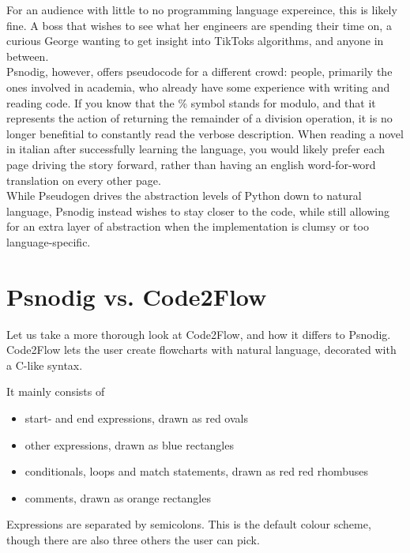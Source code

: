 For an audience with little to no programming language expereince, this is likely fine. A boss that wishes to see what her engineers are spending their time on, a curious George wanting to get insight into TikToks algorithms, and anyone in between. \hfill \\

Psnodig, however, offers pseudocode for a different crowd: people, primarily the ones involved in academia, who already have some experience with writing and reading code. If you know that the \% symbol stands for modulo, and that it represents the action of returning the remainder of a division operation, it is no longer benefitial to constantly read the verbose description. When reading a novel in italian after successfully learning the language, you would likely prefer each page driving the story forward, rather than having an english word-for-word translation on every other page. \hfill \\

While Pseudogen drives the abstraction levels of Python down to natural language, Psnodig instead wishes to stay closer to the code, while still allowing for an extra layer of abstraction when the implementation is clumsy or too language-specific.

\section{Psnodig vs. Code2Flow}

Let us take a more thorough look at Code2Flow, and how it differs to Psnodig. Code2Flow lets the user create flowcharts with natural language, decorated with a C-like syntax.

It mainly consists of

\begin{itemize}
    \item start- and end expressions, drawn as red ovals
    \item other expressions, drawn as blue rectangles
    \item conditionals, loops and match statements, drawn as red red rhombuses
    \item comments, drawn as orange rectangles
\end{itemize}

Expressions are separated by semicolons. This is the default colour scheme, though there are also three others the user can pick.

